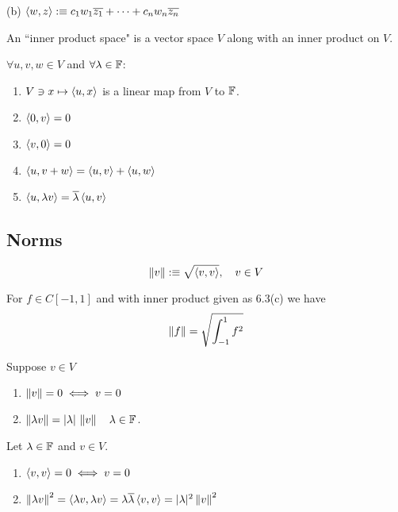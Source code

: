 \begin{example}
  (b) $\left \langle w, z \right \rangle :\equiv c_1 w_1 \overline{z_1} + \cdots + c_n w_n \overline{z_n}$
\end{example}

\begin{mydef}
  An ``inner product space" is a vector space $V$ along with an inner product on $V$.
\end{mydef}

\setcounter{thm}{5}

\begin{thm}
  $\forall u,v,w \in V$ and $\forall \lambda \in \mathbb{F}$:  
  \begin{enumerate}[label=(\alph*)]
    \item $V \ni x \mapsto \left \langle u, x \right \rangle$ is a linear map from $V$ to $\mathbb{F}$.
    \item $\left \langle 0, v \right \rangle = 0 $
    \item $\left \langle v, 0 \right \rangle = 0$
    \item $\left \langle u, v+w \right \rangle = \left \langle u, v \right \rangle + \left \langle u, w \right \rangle $
    \item $\left \langle u, \lambda v \right \rangle = \overline{\lambda} \left \langle u, v \right \rangle$
  \end{enumerate}
\end{thm}

\subsection{Norms}

\begin{mydef} [norm]
  \begin{equation}
    \left \lVert v \right \rVert :\equiv \sqrt{\left \langle v, v \right \rangle}, \quad v \in  V
  \end{equation}
\end{mydef}

\begin{example}
  For $f \in C[-1,1]$ and with inner product given as 6.3(c) we have
  \begin{equation}
    \left \lVert f \right \rVert = \sqrt { \int_{-1}^{1} f^2}
  \end{equation}
\end{example}

\begin{thm} 
  Suppose $v \in V$
  \begin{enumerate}[label=(\alph*)]
    \item $\left \lVert v \right \rVert = 0 \iff v = 0$
    \item $\left \lVert \lambda v \right \rVert = |\lambda| \,\left \lVert v \right \rVert \quad \lambda \in \mathbb{F}$.
  \end{enumerate}
\end{thm}
\begin{prf}
  Let $\lambda \in \mathbb{F}$ and $v \in V$.
  \begin{enumerate}[label=(\alph*)]
    \item $\left \langle v, v \right \rangle = 0 \iff v=0$
    \item $\left \lVert \lambda v \right \rVert^2 = \left \langle \lambda v, \lambda v \right \rangle = \lambda \overline{\lambda} \left \langle v, v \right \rangle = |\lambda|^2 \left \lVert v \right \rVert^2$
  \end{enumerate}
\end{prf}

